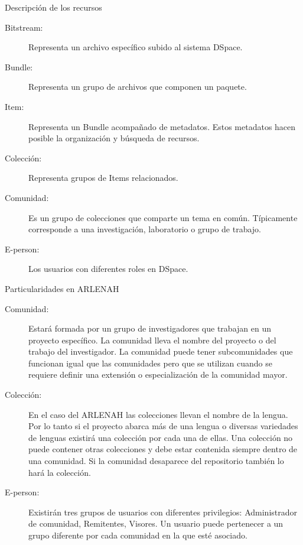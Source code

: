\documentclass[10pt]{beamer}
\begin{document}
\begin{frame}{Descripción de los recursos}
  
  \begin{description}
  \item [Bitstream:] Representa un archivo específico subido al sistema DSpace.
  \item [Bundle:] Representa un  grupo de archivos que componen un  paquete.
  \item [Item:] Representa un Bundle acompañado de metadatos. Estos metadatos hacen posible la
    organización y búsqueda de recursos.
  \item [Colección:] Representa grupos de Items relacionados.
  \item[Comunidad:]  Es un  grupo de  colecciones que  comparte un  tema en  común.  Típicamente
    corresponde a una investigación, laboratorio o grupo de trabajo.
  \item [E-person:] Los usuarios con diferentes roles en DSpace.
  \end{description}

\end{frame}

\begin{frame}{Particularidades en ARLENAH}
  
  \begin{description}
  \item [Comunidad:] Estará formada por un grupo de investigadores que trabajan en un proyecto
    específico. La comunidad lleva  el nombre del proyecto o del  trabajo del investigador. La
    comunidad puede tener  subcomunidades que funcionan igual que las  comunidades pero que se
    utilizan cuando se requiere definir una extensión o especialización de la comunidad mayor.
  \item [Colección:] En el  caso del ARLENAH las colecciones llevan el nombre  de la lengua. Por
    lo tanto si el  proyecto abarca más de una lengua o diversas  variedades de lenguas existirá
    una colección  por cada una de  ellas. Una colección  no puede contener otras  colecciones y
    debe  estar contenida  siempre dentro  de  una comunidad.   Si la  comunidad desaparece  del
    repositorio también lo hará la colección.
  \item  [E-person:]   Existirán  tres   grupos  de   usuarios  con   diferentes  privilegios:
    Administrador de comunidad,  Remitentes, Visores.  Un usuario puede pertenecer  a un grupo
    diferente por cada comunidad en la que esté asociado.
  \end{description}

\end{frame}
\end{document}
